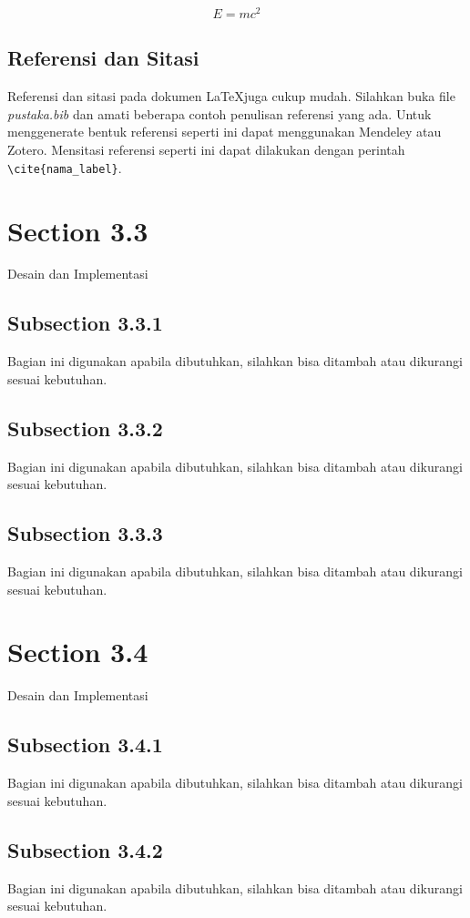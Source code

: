 \begin{equation}
    \label{eq:satu}
    E=mc^2
\end{equation}

\subsection{Referensi dan Sitasi}
Referensi dan sitasi pada dokumen \LaTeX juga cukup mudah. Silahkan buka file \textit{pustaka.bib} dan amati beberapa contoh penulisan referensi yang ada. Untuk menggenerate bentuk referensi seperti ini dapat menggunakan Mendeley atau Zotero. Mensitasi referensi seperti ini \cite{yunanto2025development} dapat dilakukan dengan perintah \verb|\cite{nama_label}|.

\section{Section 3.3}
Desain dan Implementasi

\subsection{Subsection 3.3.1}
Bagian ini digunakan apabila dibutuhkan, silahkan bisa ditambah atau dikurangi sesuai kebutuhan.

\subsection{Subsection 3.3.2}
Bagian ini digunakan apabila dibutuhkan, silahkan bisa ditambah atau dikurangi sesuai kebutuhan.

\subsection{Subsection 3.3.3}
Bagian ini digunakan apabila dibutuhkan, silahkan bisa ditambah atau dikurangi sesuai kebutuhan.

\section{Section 3.4}
Desain dan Implementasi

\subsection{Subsection 3.4.1}
Bagian ini digunakan apabila dibutuhkan, silahkan bisa ditambah atau dikurangi sesuai kebutuhan.

\subsection{Subsection 3.4.2}
Bagian ini digunakan apabila dibutuhkan, silahkan bisa ditambah atau dikurangi sesuai kebutuhan.

